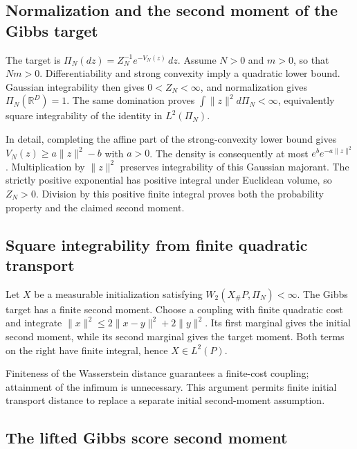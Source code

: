 \documentclass[11pt,a4paper]{article}
\begin{document}
\subsection{\texorpdfstring{Normalization and the second moment of the Gibbs target}{Normalization and the second moment of the Gibbs target}}


The target is \(\Pi_N(dz)=Z_N^{-1}e^{-V_N(z)}\,dz\). Assume \(N>0\) and \(m>0\), so that \(Nm>0\). Differentiability and strong convexity imply a quadratic lower bound. Gaussian integrability then gives \(0<Z_N<\infty\), and normalization gives \(\Pi_N(\mathbb R^D)=1\). The same domination proves \(\int\|z\|^2d\Pi_N<\infty\), equivalently square integrability of the identity in \(L^2(\Pi_N)\).



In detail, completing the affine part of the strong-convexity lower bound gives \(V_N(z)\ge a\|z\|^2-b\) with \(a>0\). The density is consequently at most \(e^b e^{-a\|z\|^2}\). Multiplication by \(\|z\|^2\) preserves integrability of this Gaussian majorant. The strictly positive exponential has positive integral under Euclidean volume, so \(Z_N>0\). Division by this positive finite integral proves both the probability property and the claimed second moment.




\subsection{\texorpdfstring{Square integrability from finite quadratic transport}{Square integrability from finite quadratic transport}}


Let \(X\) be a measurable initialization satisfying \(W_2(X_\#P,\Pi_N)<\infty\). The Gibbs target has a finite second moment. Choose a coupling with finite quadratic cost and integrate \(\|x\|^2\le2\|x-y\|^2+2\|y\|^2\). Its first marginal gives the initial second moment, while its second marginal gives the target moment. Both terms on the right have finite integral, hence \(X\in L^2(P)\).



Finiteness of the Wasserstein distance guarantees a finite-cost coupling; attainment of the infimum is unnecessary. This argument permits finite initial transport distance to replace a separate initial second-moment assumption.



\subsection{\texorpdfstring{The lifted Gibbs score second moment}{The lifted Gibbs score second moment}}
\end{document}
